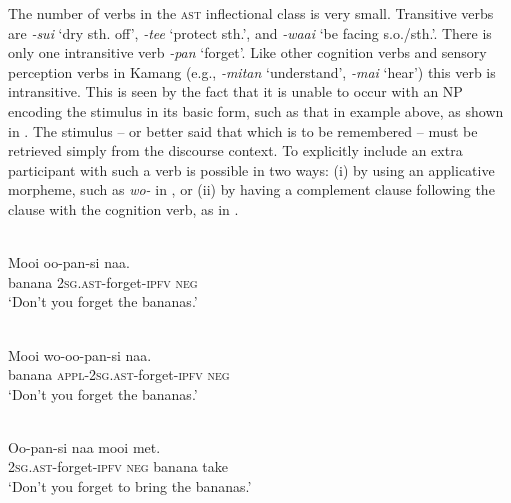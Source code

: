 



The number of verbs in the \textsc{ast} inflectional class is very small. Transitive verbs are \textit{-sui} `dry sth. off', \textit{-tee} `protect sth.', and \textit{-waai} `be facing s.o./sth.'. There is only one intransitive verb \textit{-pan} `forget'. Like other cognition verbs and sensory perception verbs in Kamang (e.g., \textit{-mitan} `understand', \textit{-mai} `hear') this verb is intransitive. This is seen by the fact that it is unable to occur with an NP encoding the stimulus in its basic form, such as that in example  above, as shown in . The stimulus -- or better said that which is to be remembered -- must be retrieved simply from the discourse context. To explicitly include an extra participant with such a verb is possible in two ways: (i) by using an applicative morpheme, such as \textit{wo-} in , or (ii) by having a complement clause following the clause with the cognition verb, as in . 


\ea%
\label{bkm:Ref372879210}
 \\ 
\gll *Mooi  oo-pan-si  naa.\\  
      banana  \textsc{2sg.ast}{}-forget-\textsc{ipfv} \textsc{neg}  \\
\glt  `Don't you forget the bananas.'
\z



 



\ea%
\label{bkm:Ref372879221}
 \\ 
\gll    Mooi  wo-oo-pan-si  naa.\\  
  banana  \textsc{appl-2sg.ast}{}-forget-\textsc{ipfv} \textsc{neg}  \\
\glt `Don't you forget the bananas.'
\z



  

  

\ea%
\label{bkm:Ref372879227}
 \\ 
\gll  Oo-pan-si  naa  mooi  met. \\  
    \textsc{2sg.ast}{}-forget-\textsc{ipfv} \textsc{neg}  banana  take \\
\glt  `Don't you forget to bring the bananas.'
\z


